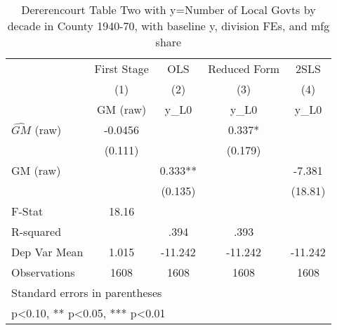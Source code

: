 \begin{table}[htbp]\centering
\def\sym#1{\ifmmode^{#1}\else\(^{#1}\)\fi}
\caption{Dererencourt Table Two with y=Number of Local Govts by decade in County 1940-70, with baseline y, division FEs, and mfg share}
\begin{tabular}{l*{4}{c}}
\toprule
                    & First Stage   &         OLS   &Reduced Form   &        2SLS   \\
                    &\multicolumn{1}{c}{(1)}&\multicolumn{1}{c}{(2)}&\multicolumn{1}{c}{(3)}&\multicolumn{1}{c}{(4)}\\
                    &\multicolumn{1}{c}{GM  (raw)}&\multicolumn{1}{c}{y\_L0}&\multicolumn{1}{c}{y\_L0}&\multicolumn{1}{c}{y\_L0}\\
\midrule
$\hat{GM}$ (raw)    &     -0.0456   &               &       0.337*  &               \\
                    &     (0.111)   &               &     (0.179)   &               \\
\addlinespace
GM  (raw)           &               &       0.333** &               &      -7.381   \\
                    &               &     (0.135)   &               &     (18.81)   \\
\midrule
F-Stat              &       18.16   &               &               &               \\
R-squared           &               &        .394   &        .393   &               \\
Dep Var Mean        &       1.015   &     -11.242   &     -11.242   &     -11.242   \\
Observations        &        1608   &        1608   &        1608   &        1608   \\
\bottomrule
\multicolumn{5}{l}{\footnotesize Standard errors in parentheses}\\
\multicolumn{5}{l}{\footnotesize * p<0.10, ** p<0.05, *** p<0.01}\\
\end{tabular}
\end{table}

